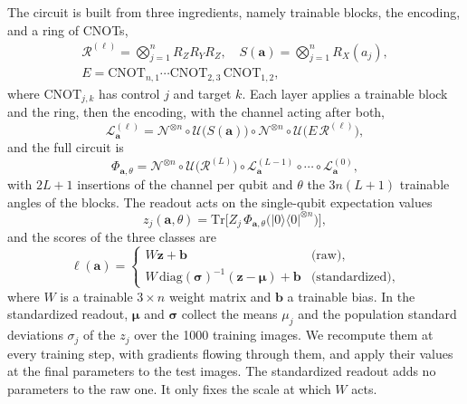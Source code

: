 \documentclass[
 aps,pra,
 twocolumn,
 superscriptaddress,
 longbibliography,
 nofootinbib
]{revtex4-2}
\newcommand{\Tr}{\mathrm{Tr}}
\providecommand{\ket}[1]{\lvert #1 \rangle}
\providecommand{\bra}[1]{\langle #1 \rvert}
\begin{document}
The circuit is built from three ingredients, namely trainable blocks, the
encoding, and a ring of CNOTs,
\begin{equation}
\begin{gathered}
\mathcal R^{(\ell)}={\textstyle\bigotimes_{j=1}^{n}}R_Z R_Y R_Z,\quad
S(\mathbf a)={\textstyle\bigotimes_{j=1}^{n}}R_X(a_j),\\
E=\mathrm{CNOT}_{n,1}\cdots\mathrm{CNOT}_{2,3}\,\mathrm{CNOT}_{1,2},
\end{gathered}
\label{eq:blocks}
\end{equation}
where $\mathrm{CNOT}_{j,k}$ has control $j$ and target $k$. Each layer applies a
trainable block and the ring, then the encoding, with the channel acting after
both,
\begin{equation}
\mathcal L^{(\ell)}_{\mathbf a}=\mathcal N^{\otimes n}\circ
\mathcal U\bigl(S(\mathbf a)\bigr)\circ\mathcal N^{\otimes n}\circ
\mathcal U\bigl(E\,\mathcal R^{(\ell)}\bigr),
\label{eq:layer}
\end{equation}
and the full circuit is
\begin{equation}
\Phi_{\mathbf a,\theta}=\mathcal N^{\otimes n}\circ\mathcal U\bigl(\mathcal R^{(L)}\bigr)
\circ\mathcal L^{(L-1)}_{\mathbf a}\circ\cdots\circ\mathcal L^{(0)}_{\mathbf a},
\label{eq:circuit}
\end{equation}
with $2L+1$ insertions of the channel per qubit and $\theta$ the $3n(L+1)$
trainable angles of the blocks. The readout acts on the
single-qubit expectation values
\begin{equation}
z_j(\mathbf a,\theta)=\Tr\bigl[Z_j\,\Phi_{\mathbf a,\theta}
\bigl(\ket0\bra0^{\otimes n}\bigr)\bigr],
\label{eq:features}
\end{equation}
and the scores of the three classes are
\begin{equation}
\ell(\mathbf a)=
\begin{cases}
W\mathbf z+\mathbf b & \text{(raw)},\\
W\,\mathrm{diag}(\boldsymbol\sigma)^{-1}(\mathbf z-\boldsymbol\mu)+\mathbf b
 & \text{(standardized)},
\end{cases}
\label{eq:readout}
\end{equation}
where $W$ is a trainable $3\times n$ weight matrix and $\mathbf b$ a trainable
bias. In the standardized readout, $\boldsymbol\mu$ and $\boldsymbol\sigma$
collect the means $\mu_j$ and the population standard deviations $\sigma_j$ of
the $z_j$ over the 1000 training images. We recompute them at every
training step, with gradients flowing through them, and apply their values at
the final parameters to the test images. The standardized readout adds no
parameters to the raw one. It only fixes the scale at which $W$ acts.
\end{document}
